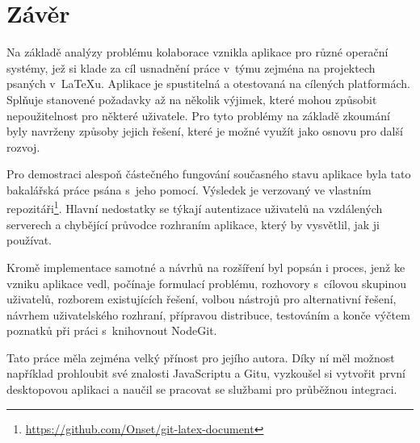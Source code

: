 \chapter{Závěr}

Na základě analýzy problému kolaborace vznikla aplikace pro různé operační systémy, jež si klade za cíl usnadnění práce v~týmu zejména na projektech psaných v~\LaTeX{u}. Aplikace je spustitelná a otestovaná na cílených platformách. Splňuje stanovené požadavky až na několik výjimek, které mohou způsobit nepoužitelnost pro některé uživatele. Pro tyto problémy na základě zkoumání byly navrženy způsoby jejich řešení, které je možné využít jako osnovu pro další rozvoj.

Pro demostraci alespoň částečného fungování současného stavu aplikace byla tato bakalářská práce psána s~jeho pomocí. Výsledek je verzovaný ve vlastním repozitáři\footnote{\url{https://github.com/Onset/git-latex-document}}. Hlavní nedostatky se týkají autentizace uživatelů na vzdálených serverech a chybějící průvodce rozhraním aplikace, který by vysvětlil, jak ji používat.

Kromě implementace samotné a návrhů na rozšíření byl popsán i proces, jenž ke vzniku aplikace vedl, počínaje formulací problému, rozhovory s~cílovou skupinou uživatelů, rozborem existujících řešení, volbou nástrojů pro alternativní řešení, návrhem uživatelského rozhraní, přípravou distribuce, testováním a konče výčtem poznatků při práci s~knihovnout NodeGit.

Tato práce měla zejména velký přínost pro jejího autora. Díky ní měl možnost například prohloubit své znalosti JavaScriptu a Gitu, vyzkoušel si vytvořit první desktopovou aplikaci a naučil se pracovat se službami pro průběžnou integraci.